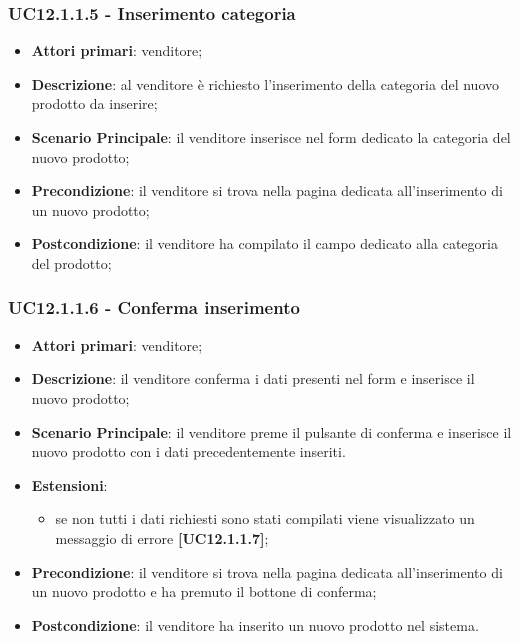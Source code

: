 \subsubsection{UC12.1.1.5 - Inserimento categoria}
\begin{itemize}
\item \textbf{Attori primari}: venditore;
\item \textbf{Descrizione}: al venditore è richiesto l'inserimento della categoria del nuovo prodotto da inserire;
\item \textbf{Scenario Principale}: il venditore inserisce nel form dedicato la categoria del nuovo prodotto;
\item \textbf{Precondizione}: il venditore si trova nella pagina dedicata all'inserimento di un nuovo prodotto;
\item \textbf{Postcondizione}: il venditore ha compilato il campo dedicato alla categoria del prodotto;
\end{itemize}

\subsubsection{UC12.1.1.6 - Conferma inserimento}
\begin{itemize}
\item \textbf{Attori primari}: venditore;
\item \textbf{Descrizione}: il venditore conferma i dati presenti nel form e inserisce il nuovo prodotto;
\item \textbf{Scenario Principale}: il venditore preme il pulsante di conferma e inserisce il nuovo prodotto con i dati precedentemente inseriti.
\item \textbf{Estensioni}: 
\begin{itemize}
	\item se non tutti i dati richiesti sono stati compilati viene visualizzato un messaggio di errore \textbf{[UC12.1.1.7]};
\end{itemize} 
\item \textbf{Precondizione}: il venditore si trova nella pagina dedicata all'inserimento di un nuovo prodotto e ha premuto il bottone di conferma;
\item \textbf{Postcondizione}: il venditore ha inserito un nuovo prodotto nel sistema.
\end{itemize}

